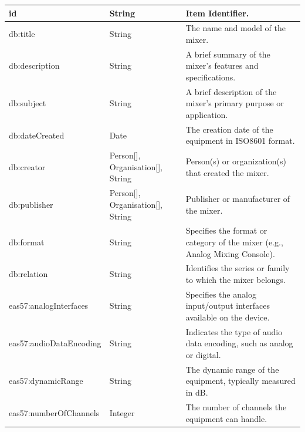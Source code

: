 \begin{longtable}{|p{}|p{}|p{}|}
    \scriptsize id                      & \scriptsize String           & \scriptsize Item Identifier. \\
    \hline
    \scriptsize db:title                & \scriptsize String           & \scriptsize The name and model of the mixer. \\
    \hline
    \scriptsize db:description          & \scriptsize String           & \scriptsize A brief summary of the mixer's features and specifications. \\
    \hline
    \scriptsize db:subject              & \scriptsize String           & \scriptsize A brief description of the mixer's primary purpose or application. \\
    \hline
    \scriptsize db:dateCreated          & \scriptsize Date             & \scriptsize The creation date of the equipment in ISO8601 format. \\
    \hline
    \scriptsize db:creator              & \scriptsize \textcolor{uniudColor3}{Person}[], \textcolor{uniudColor3}{Organisation}[], String & \scriptsize Person(s) or organization(s) that created the mixer. \\
    \hline
    \scriptsize db:publisher            & \scriptsize \textcolor{uniudColor3}{Person}[], \textcolor{uniudColor3}{Organisation}[], String & \scriptsize Publisher or manufacturer of the mixer. \\
    \hline
    \scriptsize db:format               & \scriptsize String           & \scriptsize Specifies the format or category of the mixer (e.g., Analog Mixing Console). \\
    \hline
    \scriptsize db:relation             & \scriptsize String           & \scriptsize Identifies the series or family to which the mixer belongs. \\
    \hline
    \scriptsize eas57:analogInterfaces  & \scriptsize String           & \scriptsize Specifies the analog input/output interfaces available on the device. \\
    \hline
    \scriptsize eas57:audioDataEncoding & \scriptsize String           & \scriptsize Indicates the type of audio data encoding, such as analog or digital. \\
    \hline
    \scriptsize eas57:dynamicRange      & \scriptsize String           & \scriptsize The dynamic range of the equipment, typically measured in dB. \\
    \hline
    \scriptsize eas57:numberOfChannels  & \scriptsize Integer          & \scriptsize The number of channels the equipment can handle. \\

\end{longtable}
